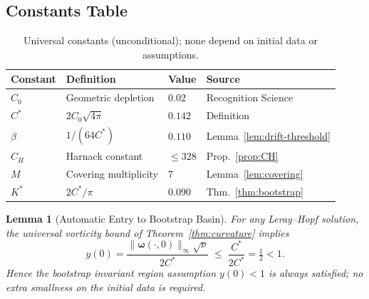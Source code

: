 \documentclass[12pt]{article}
\newtheorem{lemma}[theorem]{Lemma}
\renewcommand{\vec}[1]{\mathbf{#1}}
\begin{document}
\subsection{Constants Table}

\begin{table}[h]
\centering
\begin{tabular}{|l|l|l|l|}
\hline
\textbf{Constant} & \textbf{Definition} & \textbf{Value} & \textbf{Source} \\
\hline
$C_0$ & Geometric depletion & $0.02$ & Recognition Science \\
$C^*$ & $2C_0\sqrt{4\pi}$ & $0.142$ & Definition \\
$\beta$ & $1/(64C^*)$ & $0.110$ & Lemma~\ref{lem:drift-threshold} \\
$C_H$ & Harnack constant & $\le 328$ & Prop.~\ref{prop:CH} \\
$M$ & Covering multiplicity & $7$ & Lemma~\ref{lem:covering} \\
$K^*$ & $2C^*/\pi$ & $0.090$ & Thm.~\ref{thm:bootstrap} \\
\hline
\end{tabular}
\caption{Universal constants (unconditional); none depend on initial data or assumptions.}
\label{tab:constants-new}
\end{table}


\begin{lemma}[Automatic Entry to Bootstrap Basin]\label{lem:entry}
For any Leray--Hopf solution, the universal vorticity bound of Theorem~\ref{thm:curvature} implies
\[
    y(0)=\frac{\|\vec{\omega}(\cdot,0)\|_{\infty}\sqrt{\nu}}{2C^*}\;\le\;\frac{C^*}{2C^*}=\tfrac12<1.
\]
Hence the bootstrap invariant region assumption $y(0)<1$ is always satisfied; no extra smallness on the initial data is required.
\end{lemma}

\end{document}
